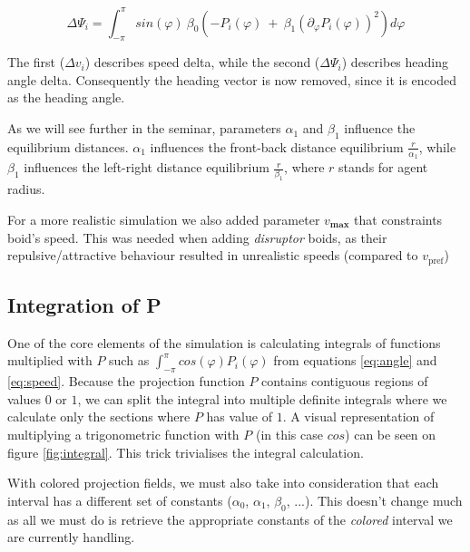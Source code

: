 \documentclass[9pt]{pnas-new}
\begin{document}
\begin{equation}
    \Delta \Psi_i =
        \int_{-\pi}^{\pi}
        sin(\varphi) \ \beta_0
        \left(
            -P_i(\varphi) \ + \ \beta_1 (\partial_{\varphi} P_i(\varphi))^2
        \right) d\varphi
    \label{eq:angle}
\end{equation}

The first ($\Delta v_i$) describes speed delta, while the second ($\Delta \Psi_i$) describes heading angle delta.
Consequently the heading vector is now removed, since it is encoded as the heading angle.

As we will see further in the seminar, parameters $\alpha_1$ and $\beta_1$ influence the equilibrium distances.
$\alpha_1$ influences the front-back distance equilibrium $\frac{r}{\alpha_1}$, while $\beta_1$ influences the left-right distance equilibrium $\frac{r}{\beta_1}$, where $r$ stands for agent radius.

For a more realistic simulation we also added parameter $v_{\textbf{max}}$ that constraints boid's speed.
This was needed when adding \textit{disruptor} boids, as their repulsive/attractive behaviour resulted in unrealistic speeds (compared to $v_{\text{pref}}$)




\subsection{Integration of P}

One of the core elements of the simulation is calculating integrals of functions multiplied with $P$ such as $\int_{-\pi}^{\pi} cos(\varphi) P_i(\varphi)$ from equations \ref{eq:angle} and \ref{eq:speed}.
Because the projection function $P$ contains contiguous regions of values $0$ or $1$, we can split the integral into multiple definite integrals where we calculate only the sections where $P$ has value of $1$.
A visual representation of multiplying a trigonometric function with $P$ (in this case $cos$) can be seen on figure \ref{fig:integral}.
This trick trivialises the integral calculation.

With colored projection fields, we must also take into consideration that each interval has a different set of constants ($\alpha_0$, $\alpha_1$, $\beta_0$, ...).
This doesn't change much as all we must do is retrieve the appropriate constants of the \textit{colored} interval we are currently handling.
\end{document}
